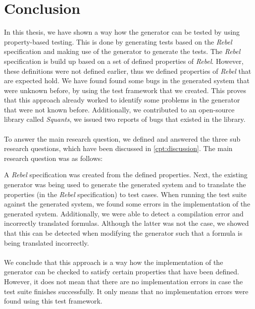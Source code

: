 \chapter{Conclusion}
\label{chp:conclusion}
In this thesis, we have shown a way how the generator can be tested by using property-based testing. This is done by generating tests based on the \textit{Rebel} specification and making use of the generator to generate the tests. The \textit{Rebel} specification is build up based on a set of defined properties of \textit{Rebel}. However, these definitions were not defined earlier, thus we defined properties of \textit{Rebel} that are expected hold. We have found found some bugs in the generated system that were unknown before, by using the test framework that we created. This proves that this approach already worked to identify some problems in the generator that were not known before. Additionally, we contributed to an open-source library called \textit{Squants}, we issued two reports of bugs that existed in the library.\\
\\
To answer the main research question, we defined and answered the three sub research questions, which have been discussed in \autoref{cpt:discussion}. The main research question was as follows:
\begin{quote}
\rqMain
\end{quote}
A \textit{Rebel} specification was created from the defined properties. Next, the existing generator was being used to generate the generated system and to translate the properties (in the \textit{Rebel} specification) to test cases. When running the test suite against the generated system, we found some errors in the implementation of the generated system. Additionally, we were able to detect a compilation error and incorrectly translated formulas. Although the latter was not the case, we showed that this can be detected when modifying the generator such that a formula is being translated incorrectly.\\
\\
We conclude that this approach is a way how the implementation of the generator can be checked to satisfy certain properties that have been defined. However, it does not mean that there are no implementation errors in case the test suite finishes successfully. It only means that no implementation errors were found using this test framework.

